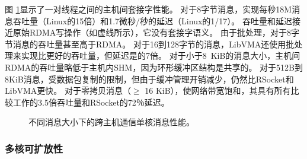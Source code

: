 图 \ref {socksdirect:fig:eval-msgsize-inter}显示了一对线程之间的主机间套接字性能。
对于8字节消息，\sys 实现每秒18M消息吞吐量（Linux的15倍）和1.7微秒/秒的延迟（Linux的1/17）。
吞吐量和延迟接近原始RDMA写操作（如虚线所示），它没有套接字语义。
由于批处理，\sys  {}对于8字节消息的吞吐量甚至高于RDMA。
对于16到128字节的消息，LibVMA还使用批处理来实现比\sys  {}更好的吞吐量，但延迟是\sys  {}的7倍。
对于小于8~KiB的消息大小，主机间RDMA的吞吐量略低于主机内SHM，因为环形缓冲区结构是共享的。
对于512B到8KiB消息，\sys  {}受数据包复制的限制，但由于缓冲管理开销减少，仍然比RSocket和LibVMA更快。
对于零拷贝消息（$\ge$ 16 KiB），\sys  {}使网络带宽饱和，其具有所有比较工作的3.5倍吞吐量和RSocket的72％延迟。


\begin{figure}[htbp]
	\centering
	
	\caption{不同消息大小下的跨主机通信单核消息性能。}
	\label{socksdirect:fig:eval-msgsize-inter}
\end{figure}




\subsubsection{多核可扩放性}






